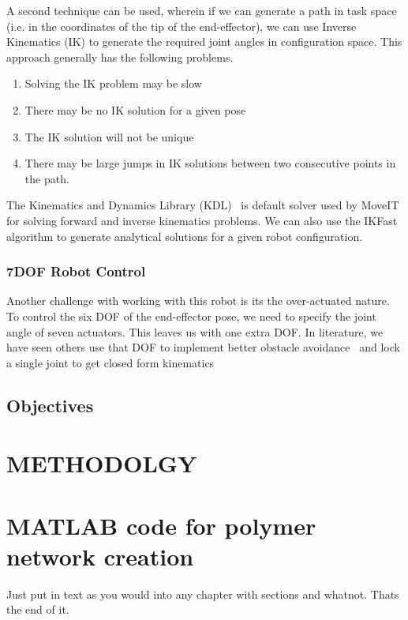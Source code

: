 \documentclass[BTech]{iitmdiss}
\begin{document}

    A second technique can be used, wherein if we can generate a path in task space (i.e. in the coordinates of the tip of the end-effector),
    we can use Inverse Kinematics (IK) to generate the required joint angles in configuration space. This approach generally has the following problems.
    \begin{enumerate}
        \item Solving the IK problem may be slow
        \item There may be no IK solution for a given pose
        \item The IK solution will not be unique
        \item There may be large jumps in IK solutions between two consecutive points in the path.
    \end{enumerate}

    The Kinematics and Dynamics Library (KDL)~\cite{kdl-url} is default solver used by MoveIT for solving forward and inverse kinematics problems.
    We can also use the IKFast algorithm to generate analytical solutions for a given robot configuration.

    \subsection{7DOF Robot Control}

    Another challenge with working with this robot is its the over-actuated nature.
    To control the six DOF of the end-effector pose, we need to specify the joint angle of seven actuators.
    This leaves us with one extra DOF.
    In literature, we have seen others use that DOF to implement better obstacle avoidance~\cite{Doliwa_2020} and lock a single joint to get closed form kinematics~\cite{Asthana}


    \section{Objectives}


    \chapter{METHODOLGY}\label{ch:introm}



    \appendix


    \chapter{MATLAB code for polymer network creation} \label{code}

    Just put in text as you would into any chapter with sections and whatnot. Thats the end of it.


    \begin{singlespace}
        
    \end{singlespace}
\end{document}
